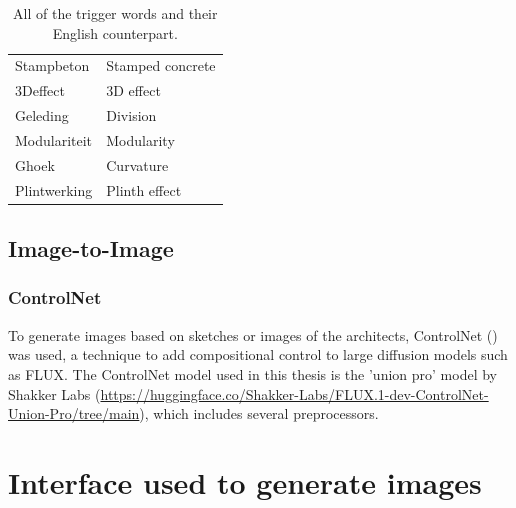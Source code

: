\begin{table}[H]
    \centering
    \begin{tabular}{ll}
        \toprule
         Stampbeton & Stamped concrete\\
         3Deffect & 3D effect\\
         Geleding & Division \\
         Modulariteit & Modularity\\
         Ghoek & Curvature\\
         Plintwerking & Plinth effect\\
         \bottomrule
    \end{tabular}
    \caption{All of the trigger words and their English counterpart.}
    \label{tab:triggerwords}
\end{table}

\subsection{Image-to-Image}
\subsubsection{ControlNet}
To generate images based on sketches or images of the architects, ControlNet (\cite{zhang_adding_2023}) was used, a technique to add compositional control to large diffusion models such as FLUX. The ControlNet model used in this thesis is the 'union pro' model by Shakker Labs (\url{https://huggingface.co/Shakker-Labs/FLUX.1-dev-ControlNet-Union-Pro/tree/main}), which includes several preprocessors.
\section{Interface used to generate images} \label{sec:Workflow used to generate images}
